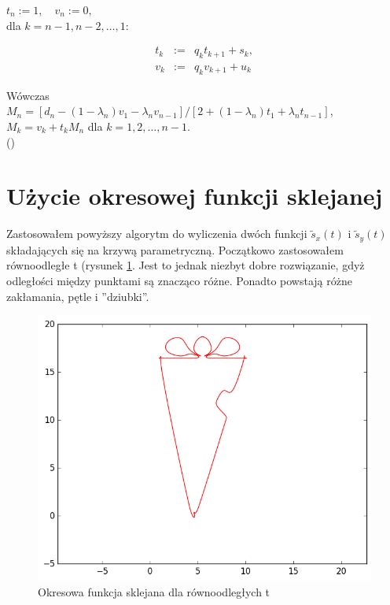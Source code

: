 \documentclass{article}
\begin{document}
$t_n := 1,\quad v_n := 0,$\\

dla $k = n-1, n-2, \ldots , 1$:

\begin{eqnarray*}
t_k &:=& q_k t_{k+1} + s_k ,\\
v_k &:=& q_k v_{k+1} + u_k
\end{eqnarray*}

Wówczas\\
$M_n = [d_n - (1 - \lambda_n )v_1 - \lambda_n v_{n-1} ]/[2 + (1 - \lambda_n )t_1 + \lambda_n t_{n-1} ]$,\\
$M_k = v_k + t_k M_n$
dla
$k = 1, 2, \ldots , n - 1$.\\
(\cite{bib1})
\section{Użycie okresowej funkcji sklejanej}

Zastosowałem powyższy algorytm do wyliczenia dwóch funkcji $\tilde{s}_x(t)$ i $\tilde{s}_y(t)$ składających się na krzywą parametryczną. Początkowo zastosowałem równoodległe t (rysunek \ref{r-o}. Jest to jednak niezbyt dobre rozwiązanie, gdyż odległości między punktami są znacząco różne. Ponadto powstają różne zakłamania, pętle i ''dziubki''.

\begin{figure}[H]
    \centering
	\includegraphics[width= 0.5 \textwidth]{okr-r.png}
    \caption{Okresowa funkcja sklejana dla równoodległych t }
 	\label{r-o}
\end{figure}
\end{document}

